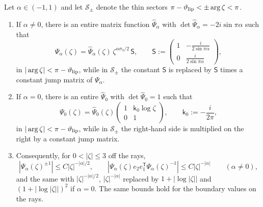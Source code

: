 \begin{lemma}\label{lem:bessel-local}
Let $\alpha\in(-1,1)$ and let $\mathcal S_\pm$ denote the thin sectors $\pi-\vartheta_{\mathrm{lip}}<\pm\arg\zeta<\pi$.
\begin{enumerate}
\item[(i)] If $\alpha\ne0$, there is an entire matrix function $\hat\Psi_\alpha$ with $\det\hat\Psi_\alpha=-2i\sin\pi\alpha$
  such that
  \[
    \Psi_\alpha(\zeta)=\hat\Psi_\alpha(\zeta)\,\zeta^{\alpha\sigma_3/2}\,\mathsf S,\qquad
    \mathsf S:=\begin{pmatrix}1&-\frac{i}{2\sin\pi\alpha}\\[1mm]0&\frac{i}{2\sin\pi\alpha}\end{pmatrix},
  \]
  in $|\arg\zeta|<\pi-\vartheta_{\mathrm{lip}}$, while in $\mathcal S_\pm$ the constant $\mathsf S$ is replaced by $\mathsf S$ times
  a constant jump matrix of $\Psi_\alpha$.
\item[(ii)] If $\alpha=0$, there is an entire $\hat\Psi_0$ with $\det\hat\Psi_0=1$ such that
  \[
    \Psi_0(\zeta)=\hat\Psi_0(\zeta)\begin{pmatrix}1&\mathsf k_0\log\zeta\\0&1\end{pmatrix},\qquad \mathsf k_0:=-\frac{i}{2\pi},
  \]
  in $|\arg\zeta|<\pi-\vartheta_{\mathrm{lip}}$, while in $\mathcal S_\pm$ the right-hand side is multiplied on the right by a
  constant jump matrix.
\item[(iii)] Consequently, for $0<|\zeta|\le3$ off the rays,
  \[
    |\Psi_\alpha(\zeta)^{\pm1}|\le C|\zeta|^{-|\alpha|/2},\qquad
    |\Psi_\alpha(\zeta)e_2e_1^{\mathsf T}\Psi_\alpha(\zeta)^{-1}|\le C|\zeta|^{-|\alpha|}\qquad(\alpha\ne0),
  \]
  and the same with $|\zeta|^{-|\alpha|/2}$, $|\zeta|^{-|\alpha|}$ replaced by $1+|\log|\zeta||$ and
  $(1+|\log|\zeta||)^2$ if $\alpha=0$. The same bounds hold for the boundary values on the rays.
\end{enumerate}
\end{lemma}

